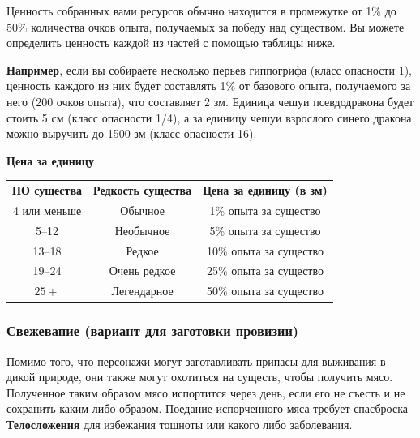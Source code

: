 \documentclass[a4paper, 9pt, twocolumn]{book}
\begin{document}
	Ценность собранных вами ресурсов обычно находится в промежутке от 1\% до 50\% количества очков опыта, получаемых за победу над существом. Вы можете определить ценность каждой из частей с помощью таблицы ниже.
	
	\textbf{Например}, если вы собираете несколько перьев гиппогрифа (класс опасности 1), ценность каждого из них будет составлять 1\% от базового опыта, получаемого за него (200 очков опыта), что составляет 2 зм. Единица чешуи псевдодракона будет стоить 5 см (класс опасности 1/4), а за единицу чешуи взрослого синего дракона можно выручить до 1500 зм (класс опасности 16).
	
	\begin{center}
	
	\begin{table}[H]
		
		{\Large\textbf{Цена за единицу}}
		
		\centering
		
		\medspace
		
		\begin{tabularx}{\linewidth}{C C C}
			\textbf{ПО существа} & \textbf{Редкость существа} & \textbf{Цена за единицу (в зм)} \\
			4 или меньше & Обычное & 1\% опыта за существо \\
			5--12 & Необычное & 5\% опыта за существо \\
			13--18 & Редкое & 10\% опыта за существо \\
			19--24 & Очень редкое & 25\% опыта за существо  \\
			$25+$ & Легендарное & 50\% опыта за существо \\
		\end{tabularx}
\end{table}
	\end{center}
	
	\subsubsection{Свежевание (вариант для заготовки провизии)}
	
	Помимо того, что персонажи могут заготавливать припасы для выживания в дикой природе, они также могут охотиться на существ, чтобы получить мясо. Полученное таким образом мясо испортится через день, если его не съесть и не сохранить каким-либо образом. Поедание испорченного мяса требует спасброска \textbf{Телосложения} для избежания тошноты или какого либо заболевания.
	
\end{document}
